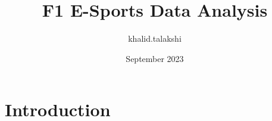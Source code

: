 \documentclass{article}
\title{F1 E-Sports Data Analysis}
\author{khalid.talakshi }
\date{September 2023}
\begin{document}
\maketitle

\section{Introduction}
\end{document}
